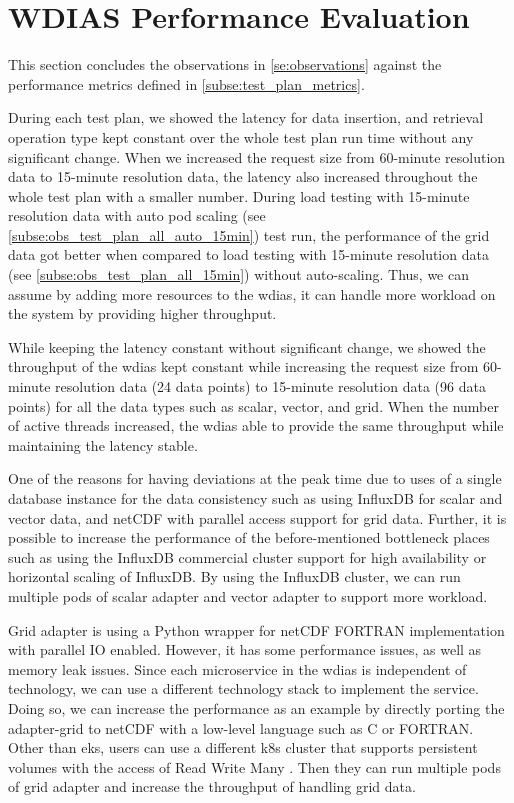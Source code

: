 \section{WDIAS Performance Evaluation}
\label{se:discussion}

This section concludes the observations in \cref{se:observations} against the performance metrics defined in \cref{subse:test_plan_metrics}.

During each test plan, we showed the latency for data insertion, and retrieval operation type kept constant over the whole test plan run time without any significant change. When we increased the request size from 60-minute resolution data to 15-minute resolution data, the latency also increased throughout the whole test plan with a smaller number.
During load testing with 15-minute resolution data with auto pod
scaling (see \cref{subse:obs_test_plan_all_auto_15min}) test run, the performance of the grid data got better when compared to load testing with 15-minute resolution data (see \cref{subse:obs_test_plan_all_15min}) without auto-scaling. Thus, we can assume by adding more resources to the \acrshort{wdias}, it can handle more workload on the system by providing higher throughput.

While keeping the latency constant without significant change, we showed the throughput of the \acrshort{wdias} kept constant while increasing the request size from 60-minute resolution data (24 data points) to 15-minute resolution data (96 data points) for all the data types such as scalar, vector, and grid. When the number of active threads increased, the \acrshort{wdias} able to provide the same throughput while maintaining the latency stable.

One of the reasons for having deviations at the peak time due to uses of a single database instance for the data consistency such as using InfluxDB for scalar and vector data, and netCDF with parallel access support for grid data. Further, it is possible to increase the performance of the before-mentioned bottleneck places such as using the InfluxDB commercial cluster support for high availability or horizontal scaling of InfluxDB. By using the InfluxDB cluster, we can run multiple pods of scalar adapter and vector adapter to support more workload.

Grid adapter is using a Python wrapper for netCDF FORTRAN implementation with parallel IO enabled. However, it has some performance issues, as well as memory leak issues. Since each microservice in the \acrshort{wdias} is independent of technology, we can use a different technology stack to implement the service. Doing so, we can increase the performance as an example by directly porting the adapter-grid to netCDF with a low-level language such as C or FORTRAN. Other than \acrshort{eks}, users can use a different \acrshort{k8s} cluster that supports persistent volumes with the access of Read Write Many \cite{LinuxFoundationPersistentKubernetes}. Then they can run multiple pods of grid adapter and increase the throughput of handling grid data.

